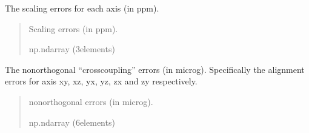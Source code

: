 \documentclass[letterpaper,10pt,english]{sphinxmanual}
\begin{document}
\begin{fulllineitems}
\begin{fulllineitems}
\label{\detokenize{modules/measurement/error_properties:qnav.measurement.error_properties.ErrorProperties.scale_error}}
\pysigstartsignatures
{}
\pysigstopsignatures
\sphinxAtStartPar
The scaling errors for each axis (in ppm).
\begin{quote}\begin{description}
\sphinxAtStartPar
Scaling errors (in ppm).

\sphinxAtStartPar
np.ndarray (3\sphinxhyphen{}elements)

\end{description}\end{quote}

\end{fulllineitems}


\begin{fulllineitems}
\label{\detokenize{modules/measurement/error_properties:qnav.measurement.error_properties.ErrorProperties.non_orth_error}}
\pysigstartsignatures
{}
\pysigstopsignatures
\sphinxAtStartPar
The non\sphinxhyphen{}orthogonal “cross\sphinxhyphen{}coupling” errors (in micro\sphinxhyphen{}g).
Specifically the alignment errors for axis xy, xz, yx, yz,
zx and zy respectively.
\begin{quote}\begin{description}
\sphinxAtStartPar
non\sphinxhyphen{}orthogonal errors (in micro\sphinxhyphen{}g).

\sphinxAtStartPar
np.ndarray (6\sphinxhyphen{}elements)

\end{description}\end{quote}

\end{fulllineitems}



\end{fulllineitems}
\end{document}

